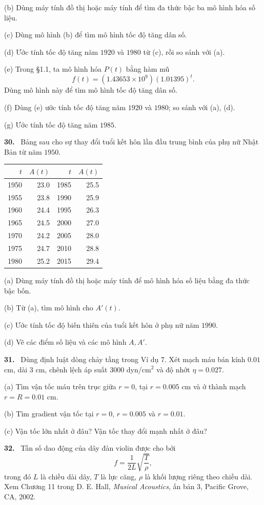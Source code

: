 \documentclass[12pt,a4paper]{article}
\newcommand{\bt}[1]{\par\smallskip\noindent\textbf{#1.}\ }
\begin{document}
(b) Dùng máy tính đồ thị hoặc máy tính để tìm đa thức bậc ba mô hình hóa số liệu.

(c) Dùng mô hình (b) để tìm mô hình tốc độ tăng dân số.

(d) Ước tính tốc độ tăng năm $1920$ và $1980$ từ (c), rồi so sánh với (a).

(e) Trong §1.1, ta mô hình hóa $P(t)$ bằng hàm mũ
\[f(t)=(1.43653\times10^9)(1.01395)^t.\]
Dùng mô hình này để tìm mô hình tốc độ tăng dân số.

(f) Dùng (e) ước tính tốc độ tăng năm $1920$ và $1980$; so sánh với (a), (d).

(g) Ước tính tốc độ tăng năm $1985$.
\bt{30} Bảng sau cho sự thay đổi tuổi kết hôn lần đầu trung bình của phụ nữ Nhật Bản từ năm $1950$.
\begin{center}\begin{tabular}{rrrr}\toprule
$t$ & $A(t)$ & $t$ & $A(t)$\\\midrule
1950&23.0&1985&25.5\\1955&23.8&1990&25.9\\1960&24.4&1995&26.3\\1965&24.5&2000&27.0\\1970&24.2&2005&28.0\\1975&24.7&2010&28.8\\1980&25.2&2015&29.4\\\bottomrule
\end{tabular}\end{center}
(a) Dùng máy tính đồ thị hoặc máy tính để mô hình hóa số liệu bằng đa thức bậc bốn.

(b) Từ (a), tìm mô hình cho $A'(t)$.

(c) Ước tính tốc độ biến thiên của tuổi kết hôn ở phụ nữ năm $1990$.

(d) Vẽ các điểm số liệu và các mô hình $A,A'$.
\par\medskip\noindent\begin{minipage}{\linewidth}
\bt{31} Dùng định luật dòng chảy tầng trong Ví dụ 7. Xét mạch máu bán kính $0.01$ cm, dài $3$ cm, chênh lệch áp suất $3000$ dyn/cm$^2$ và độ nhớt $\eta=0.027$.

(a) Tìm vận tốc máu trên trục giữa $r=0$, tại $r=0.005$ cm và ở thành mạch $r=R=0.01$ cm.

(b) Tìm gradient vận tốc tại $r=0$, $r=0.005$ và $r=0.01$.

(c) Vận tốc lớn nhất ở đâu? Vận tốc thay đổi mạnh nhất ở đâu?
\end{minipage}\par\medskip
\bt{32} Tần số dao động của dây đàn violin được cho bởi
\[f=\frac1{2L}\sqrt{\frac T\rho},\]
trong đó $L$ là chiều dài dây, $T$ là lực căng, $\rho$ là khối lượng riêng theo chiều dài. Xem Chương 11 trong D. E. Hall, \textit{Musical Acoustics}, ấn bản 3, Pacific Grove, CA, 2002.
\end{document}
